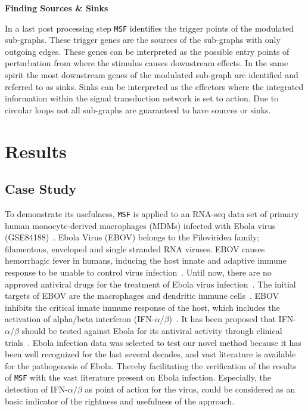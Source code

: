\documentclass[10pt,a4paper,twocolumn]{article}
\begin{document}
\textbf{Finding Sources \& Sinks}

In a last post processing step \texttt{MSF} identifies the trigger points
of the modulated sub-graphs. These trigger genes are the sources of the
sub-graphs with only outgoing edges. These genes can be interpreted as the
possible entry points of perturbation from where the stimulus causes
downstream effects. In the same spirit the most downstream genes of the
modulated sub-graph are identified and referred to as sinks. Sinks can be
interpreted as the effectors where the integrated information within the
signal transduction network is set to action. Due to circular loops not all
sub-graphs are guaranteed to have sources or sinks.


\section*{Results}

\subsection*{Case Study}

To demonstrate its usefulness, \texttt{MSF} is applied to an RNA-seq data
set of primary human monocyte-derived macrophages (MDMs) infected with
Ebola virus (GSE84188)~\cite{Olejnik}. Ebola Virus (EBOV) belongs to the
Filoviridea family; filamentous, enveloped and single stranded RNA
viruses. EBOV causes hemorrhagic fever in humans, inducing the host innate
and adaptive immune response to be unable to control virus
infection~\cite{Prins}. Until now, there are no approved antiviral drugs
for the treatment of Ebola virus infection~\cite{Konde,Rhein}.  The initial
targets of EBOV are the macrophages and dendritic immune
cells~\cite{Falasca,Rhein}. EBOV inhibits the critical innate immune
response of the host, which includes the activation of alpha/beta
interferon (IFN-$\alpha / \beta$)~\cite{Prins,Konde,Cardenas}. It has been
proposed that IFN-$\alpha / \beta$ should be tested against Ebola for its
antiviral activity through clinical trials~\cite{Konde}. Ebola infection
data was selected to test our novel method because it has been well recognized for the last several decades, and vast literature is available for the pathogenesis of Ebola. Thereby facilitating the verification of the results of
\texttt{MSF} with the vast literature present on Ebola
infection. Especially, the detection of IFN-$\alpha / \beta$ as point of
action for the virus, could be considered as an basic indicator of the
rightness and usefulness of the approach.
\end{document}
